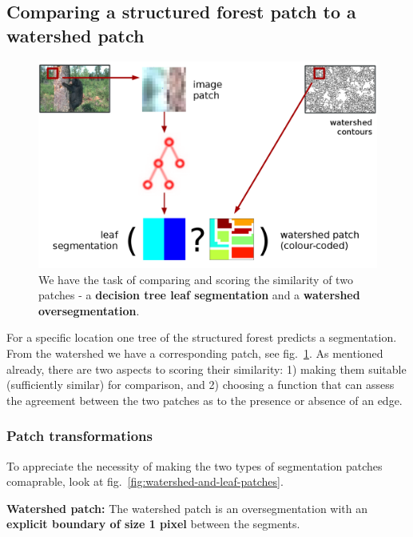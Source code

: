 \subsection{Comparing a structured forest patch to a watershed patch}
\begin{figure}[ht!]
\centering
 \includegraphics[width=1\textwidth]{images/SE-SV-UCM/weighting-the-watershed-contours-two-patches.png}
\caption{We have the task of comparing and scoring the similarity of two patches - a \textbf{decision tree leaf segmentation} and a \textbf{watershed oversegmentation}.}
\label{fig:weighting-the-watershed-contours}
\end{figure}

For a specific location one tree of the structured forest predicts a segmentation. From the watershed we have a corresponding patch, see fig.~\ref{fig:weighting-the-watershed-contours}. As mentioned already, there are two aspects to scoring their similarity: 1) making them suitable (\ie sufficiently similar) for comparison, and 2) choosing a function that can assess the agreement between the two patches as to the presence or absence of an edge.

\subsubsection{Patch transformations}
To appreciate the necessity of making the two types of segmentation patches comaprable, look at fig.~\ref{fig:watershed-and-leaf-patches}.

\textbf{Watershed patch:} The watershed patch is an oversegmentation with an \textbf{explicit boundary of size 1 pixel} between the segments.

